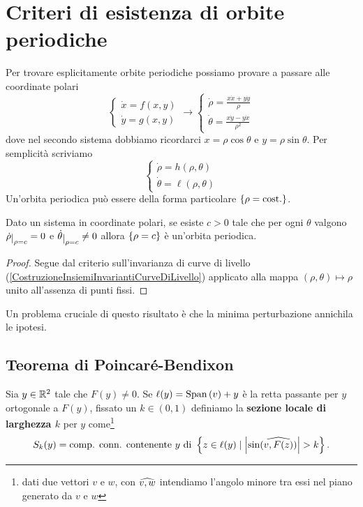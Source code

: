 \section{Criteri di esistenza di orbite periodiche}
Per trovare esplicitamente orbite periodiche possiamo provare a passare alle coordinate polari
\[\begin{cases}
\dot x=f(x,y)\\
\dot y=g(x,y)
\end{cases} \longrightarrow \begin{cases}
\displaystyle\dot \rho =\frac{x\dot x+y\dot y}{\rho}\\
\displaystyle\dot\theta=\frac{x\dot y-y\dot x}{\rho^2}
\end{cases}\]
dove nel secondo sistema dobbiamo ricordarci $x=\rho\cos\theta$ e $y=\rho\sin\theta$. Per semplicit\`a scriviamo
\[\begin{cases}
\dot \rho=h(\rho,\theta)\\
\dot \theta=\ell(\rho,\theta)
\end{cases}\]
Un'orbita periodica pu\`o essere della forma particolare $\left\{{\rho=\text{cost.}}\right\}$.
\begin{proposition}\label{CriterioPolareEsistenzaOrbitaPeriodica}
Dato un sistema in coordinate polari, se esiste $c>0$ tale che per ogni $\theta$ valgono $\dot\rho\res{\rho=c}=0$ e $\dot\theta\res{\rho=c}\neq0$ allora $\left\{{\rho=c}\right\}$ \`e un'orbita periodica.
\end{proposition}
\begin{proof}
Segue dal criterio sull'invarianza di curve di livello (\ref{CostruzioneInsiemiInvariantiCurveDiLivello}) applicato alla mappa $(\rho,\theta)\mapsto\rho$ unito all'assenza di punti fissi.
\end{proof}
\noindent Un problema cruciale di questo risultato \`e che la minima perturbazione annichila le ipotesi.

\subsection{Teorema di Poincar\'e-Bendixon}

\begin{definition}
Sia $y\in \mathbb{R}^2$ tale che $F(y)\neq 0$. Se $\ell(y)=\mathrm{Span}\,(v)+y$ \`e la retta passante per $y$ ortogonale a $F(y)$, fissato un $k\in (0,1)$ definiamo la \textbf{sezione locale di larghezza $k$} per $y$ come\footnote{dati due vettori $v$ e $w$, con $\widehat{v,w}$ intendiamo l'angolo minore tra essi nel piano generato da $v$ e $w$}
\[S_k(y)=\text{comp. conn. contenente $y$ di }\cpa{z\in \ell(y)\mid \abs{\sin(\wh{v,F(z)})}>k}.\]
\end{definition}

